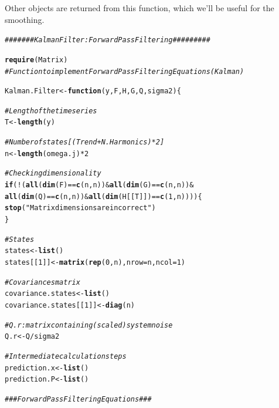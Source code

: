 \documentclass{article}\usepackage[]{graphicx}\usepackage[]{color}
\makeatletter
\newcommand{\hlnum}[1]{\textcolor[rgb]{0.686,0.059,0.569}{#1}}%
\newcommand{\hlstr}[1]{\textcolor[rgb]{0.192,0.494,0.8}{#1}}%
\newcommand{\hlcom}[1]{\textcolor[rgb]{0.678,0.584,0.686}{\textit{#1}}}%
\newcommand{\hlopt}[1]{\textcolor[rgb]{0,0,0}{#1}}%
\newcommand{\hlstd}[1]{\textcolor[rgb]{0.345,0.345,0.345}{#1}}%
\newcommand{\hlkwa}[1]{\textcolor[rgb]{0.161,0.373,0.58}{\textbf{#1}}}%
\newcommand{\hlkwb}[1]{\textcolor[rgb]{0.69,0.353,0.396}{#1}}%
\newcommand{\hlkwc}[1]{\textcolor[rgb]{0.333,0.667,0.333}{#1}}%
\newcommand{\hlkwd}[1]{\textcolor[rgb]{0.737,0.353,0.396}{\textbf{#1}}}%
\newenvironment{kframe}{%
 \def\at@end@of@kframe{}%
 \ifinner\ifhmode%
  \def\at@end@of@kframe{\end{minipage}}%
  \begin{minipage}{\columnwidth}%
 \fi\fi%
 \def\FrameCommand##1{\hskip\@totalleftmargin \hskip-\fboxsep
 \colorbox{shadecolor}{##1}\hskip-\fboxsep
     \hskip-\linewidth \hskip-\@totalleftmargin \hskip\columnwidth}%
 \MakeFramed {\advance\hsize-\width
   \@totalleftmargin\z@ \linewidth\hsize
   \@setminipage}}%
 {\par\unskip\endMakeFramed%
 \at@end@of@kframe}
\newenvironment{knitrout}{}{} %
\makeatother
\begin{document}
Other objects are returned from this function, which we'll be useful for the smoothing. 
\begin{knitrout}\footnotesize
{}\color{fgcolor}\begin{kframe}
\begin{alltt}
\hlcom{####### Kalman Filter:  Forward Pass Filtering #########}

\hlkwd{require}\hlstd{(Matrix)}
\hlcom{# Function to implement Forward Pass Filtering Equations (Kalman)}

\hlstd{Kalman.Filter} \hlkwb{<-} \hlkwa{function}\hlstd{(}\hlkwc{y}\hlstd{,} \hlkwc{F}\hlstd{,} \hlkwc{H}\hlstd{,} \hlkwc{G}\hlstd{,} \hlkwc{Q}\hlstd{,} \hlkwc{sigma2}\hlstd{) \{}

  \hlcom{# Length of the time series}
  \hlstd{T} \hlkwb{<-} \hlkwd{length}\hlstd{(y)}

  \hlcom{# Number of states  [(Trend + N.Harmonics) * 2]}
  \hlstd{n} \hlkwb{<-} \hlkwd{length}\hlstd{(omega.j)} \hlopt{*} \hlnum{2}


  \hlcom{# Checking dimensionality}
  \hlkwa{if}\hlstd{(}\hlopt{!}\hlstd{(} \hlkwd{all}\hlstd{(}\hlkwd{dim}\hlstd{(F)} \hlopt{==} \hlkwd{c}\hlstd{(n, n))} \hlopt{&} \hlkwd{all}\hlstd{(}\hlkwd{dim}\hlstd{(G)} \hlopt{==} \hlkwd{c}\hlstd{(n, n))} \hlopt{&}
        \hlkwd{all}\hlstd{(}\hlkwd{dim}\hlstd{(Q)} \hlopt{==} \hlkwd{c}\hlstd{(n, n))} \hlopt{&} \hlkwd{all}\hlstd{(}\hlkwd{dim}\hlstd{(H[[T]])} \hlopt{==} \hlkwd{c}\hlstd{(}\hlnum{1}\hlstd{, n)))) \{}
    \hlkwd{stop}\hlstd{(}\hlstr{"Matrix dimensions are incorrect"}\hlstd{)}
  \hlstd{\}}

  \hlcom{# States}
  \hlstd{states} \hlkwb{<-} \hlkwd{list}\hlstd{()}
  \hlstd{states[[}\hlnum{1}\hlstd{]]} \hlkwb{<-} \hlkwd{matrix}\hlstd{(}\hlkwd{rep}\hlstd{(}\hlnum{0}\hlstd{, n),} \hlkwc{nrow} \hlstd{= n,} \hlkwc{ncol} \hlstd{=} \hlnum{1}\hlstd{)}

  \hlcom{# Covariances matrix}
  \hlstd{covariance.states} \hlkwb{<-} \hlkwd{list}\hlstd{()}
  \hlstd{covariance.states[[}\hlnum{1}\hlstd{]]} \hlkwb{<-} \hlkwd{diag}\hlstd{(n)}

  \hlcom{# Q.r: matrix containing (scaled) system noise }
  \hlstd{Q.r} \hlkwb{<-} \hlstd{Q} \hlopt{/} \hlstd{sigma2}

  \hlcom{# Intermediate calculation steps}
  \hlstd{prediction.x} \hlkwb{<-} \hlkwd{list}\hlstd{()}
  \hlstd{prediction.P} \hlkwb{<-} \hlkwd{list}\hlstd{()}


  \hlcom{### Forward Pass Filtering Equations ###}


\end{alltt}
\end{kframe}
\end{knitrout}
\end{document}

